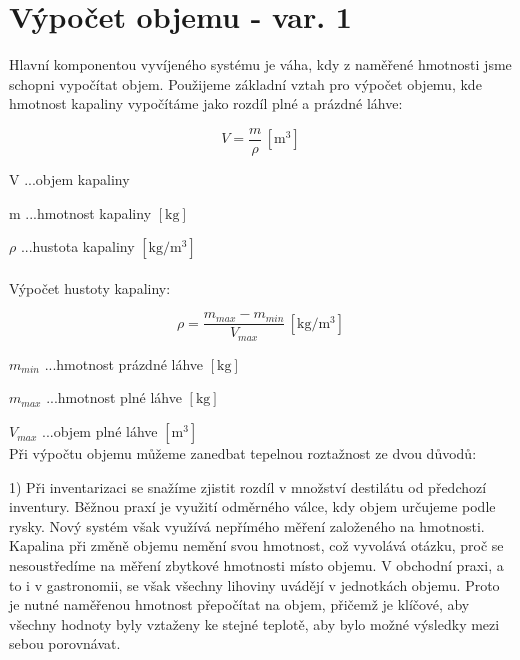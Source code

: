 \chapter{Výpočet objemu - var. 1}
Hlavní komponentou vyvíjeného systému je váha, kdy z naměřené hmotnosti jsme schopni vypočítat objem. Použijeme základní vztah pro výpočet objemu, kde hmotnost kapaliny vypočítáme jako rozdíl plné a prázdné láhve:

\begin{equation}
    V = \frac{m}{\rho} \, \left[\mathrm{m^3}\right] \label{objem_kapalina}
 \end{equation}

V ...objem kapaliny

m ...hmotnost kapaliny \([\mathrm{kg}]\)

\(\rho\) ...hustota kapaliny \([\mathrm{kg/m^3}]\)
\\
\\
Výpočet hustoty kapaliny:





\begin{equation}
    \rho = \frac{m_{max} - m_{min}}{V_{max}} \, \left[\mathrm{kg/m^3}\right] \label{objem_kapalina}
\end{equation}

\(m_{min}\) ...hmotnost prázdné láhve \([\mathrm{kg}]\)

\(m_{max}\) ...hmotnost plné láhve \([\mathrm{kg}]\)

\(V_{max}\) ...objem plné láhve \([\mathrm{m^3}]\)
\\


Při výpočtu objemu můžeme zanedbat tepelnou roztažnost ze dvou důvodů:

1)
Při inventarizaci se snažíme zjistit rozdíl v množství destilátu od předchozí inventury. Běžnou praxí je využití odměrného válce, kdy objem určujeme podle rysky. Nový systém však využívá nepřímého měření založeného na hmotnosti. Kapalina při změně objemu nemění svou hmotnost, což vyvolává otázku, proč se nesoustředíme na měření zbytkové hmotnosti místo objemu. V obchodní praxi, a to i v gastronomii, se však všechny lihoviny uvádějí v jednotkách objemu. Proto je nutné naměřenou hmotnost přepočítat na objem, přičemž je klíčové, aby všechny hodnoty byly vztaženy ke stejné teplotě, aby bylo možné výsledky mezi sebou porovnávat. 

